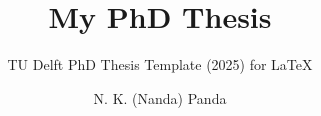 \documentclass{layout/TU-Delft-report}
\begin{document}
\frontmatter


\title{\textbf{My PhD Thesis}}

\subtitle{TU Delft PhD Thesis Template (2025) for \LaTeX} 

\author{N. K. (Nanda) Panda}
\subject{Delft University of Technology }
\makecover





\tableofcontents



\mainmatter





\appendix



\end{document}
